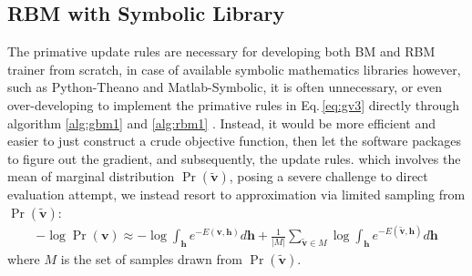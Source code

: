 \documentclass[11pt]{article}
\newcommand{\vh}{\boldsymbol{h}}
\newcommand{\vv}{\boldsymbol{v}}
\newcommand{\vvt}{\tilde{\vv}}
\begin{document}
{\subsection{RBM with Symbolic Library}
The primative update rules are necessary for developing both BM and RBM trainer from scratch, in case of available symbolic mathematics libraries however, such as Python-Theano and Matlab-Symbolic, it is often unnecessary, or even over-developing to implement the primative rules in Eq.\,\eqref{eq:gv3} directly through algorithm \eqref{alg:gbm1} and \eqref{alg:rbm1} . Instead, it would be more efficient and easier to just construct a crude objective function, then let the software packages to figure out the gradient, and subsequently, the update rules. 
which involves the mean of marginal distribution $\Pr(\vvt)$, posing a severe challenge to direct evaluation attempt, we instead resort to approximation via limited sampling from $\Pr(\vvt)$:
\begin{align}\label{eq:rbm:gv1}
  -\log{\Pr(\vv)} \approx -\log{\int_{\vh} e^{-E(\vv, \vh)} d\vh} + \frac{1}{|M|}\sum_{\vvt \in M}{\log{\int_{\vh} e^{-E(\vvt, \vh)}d\vh}}
\end{align}
where $M$ is the set of samples drawn from $\Pr(\vvt)$. \\
}
\end{document}
